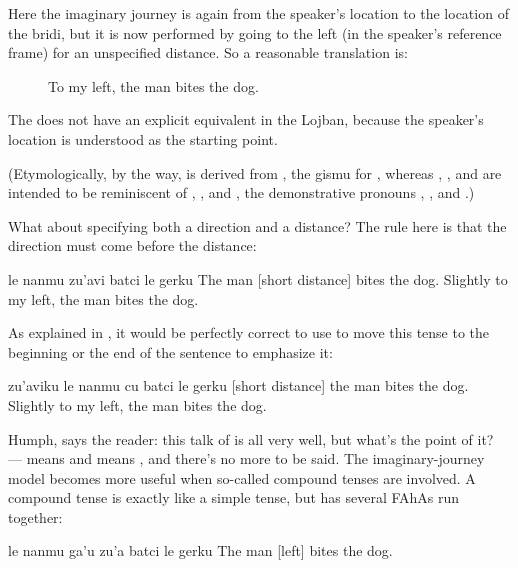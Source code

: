 Here the imaginary journey is again from the speaker's
    location to the location of the bridi, but it is now performed
    by going to the left (in the speaker's reference frame) for an
    unspecified distance. So a reasonable translation is:
\begin{description}
\item[] To my left, the man bites the dog.

\end{description}

The  does not have an explicit equivalent in the
    Lojban, because the speaker's location is understood as the
    starting point.

(Etymologically, by the way,  is derived from
    , the gismu for , whereas , , and
     are intended to be reminiscent of , , and
    , the demonstrative pronouns ,
    , and .)

What about specifying both a direction and a distance? The
    rule here is that the direction must come before the
    distance:
\begin{example}
le nanmu zu'avi batci le gerku\n
The man  [short distance] bites the dog.\n
Slightly to my left, the man bites the dog.
\end{example}

As explained in , it would be
    perfectly correct to use  to move this tense to the
    beginning or the end of the sentence to emphasize it:
\begin{example}
zu'aviku le nanmu cu batci le gerku\n
{} [short distance] the man bites the dog.\n
Slightly to my left, the man bites the dog.
\end{example}



Humph, says the reader: this talk of 
    is all very well, but what's the point of it? --- 
    means  and  means , and there's
    no more to be said. The imaginary-journey model becomes more
    useful when so-called compound tenses are involved. A compound
    tense is exactly like a simple tense, but has several FAhAs run
    together:
\begin{example}
le nanmu ga'u zu'a batci le gerku\n
The man  [left] bites the dog.
\end{example}

